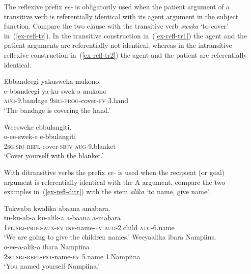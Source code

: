 The reflexive prefix \emph{ee-} is obligatorily used when the patient argument of a transitive verb is referentially identical with its agent argument in the subject function. 
Compare the two clause with the transitive verb \emph{swaka} `to cover' in~(\ref{ex-refl-tr}). 
In the transitive construction in~(\ref{ex-refl-tr1}) the agent and the patient arguments are referentially not identical, whereas in the intransitive reflexive construction  in~(\ref{ex-refl-tr2}) the agent and the patient are referentially identical.

\ea \label{ex-refl-tr}
\begin{xlist}
\ex \label{ex-refl-tr1}
	\glll Ebbandeegi yakusweka mukono.\\
	 e-bbandeegi 	ya-ku-swek-a mukono\\
		\textsc{aug}-9.bandage	\textsc{9sbj}-\textsc{prog}-cover-\textsc{fv} 3.hand\\
	\glt `The bandage is covering the hand.'

\ex \label{ex-refl-tr2}
	\glll Weesweke ebbulangiti.\\
	  o-ee-swek-e				e-bbulangiti\\
		2\textsc{sg.sbj}-\textsc{refl}-cover-\textsc{sbjv}	\textsc{aug}-9.blanket\\
	\glt `Cover yourself with the blanket.'
\end{xlist}	
\z

With ditransitive verbs the prefix \emph{ee-} is used when the recipient (or goal) argument is referentially identical with the A argument, compare the two examples in~(\ref{ex-refl-ditr}) with the stem \emph{alika} ‘to name, give name’.

\ea \label{ex-refl-ditr}
\begin{xlist}
\ex \label{ex-refl-ditr1}
	\glll Tukwaba    kwalika	abaana amabara.\\
		  tu-ku-ab-a    			ku-alik-a		a-baana 	a-mabara\\
		1\textsc{pl.sbj}-\textsc{prog}-\textsc{aux}-\textsc{fv}	\textsc{inf}-name-\textsc{fv}	\textsc{aug}-2.child	\textsc{aug}-6.name\\
	\glt ‘We are going to give the children names.’
\ex \label{ex-refl-ditr2}
	\glll Weeyaalika ibara Nampiina.\\
		  o-ee-a-alik-a 				ibara		Nampiina\\
		2\textsc{sg.sbj}-\textsc{refl}-\textsc{pst}-name-\textsc{fv}		5.name	1.Nampiina\\
	\glt ‘You named yourself Nampiina.’
\end{xlist}
\z

